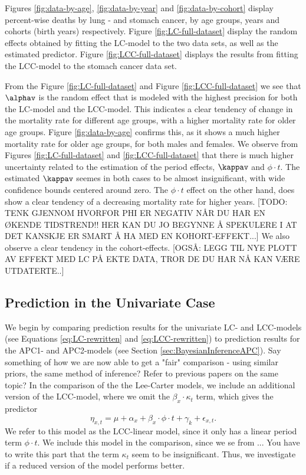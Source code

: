 \newpar Figures \ref{fig:data-by-age}, \ref{fig:data-by-year} and \ref{fig:data-by-cohort} display percent-wise deaths by lung - and stomach cancer, by age groups, years and cohorts (birth years) respectively. Figure \ref{fig:LC-full-dataset} display the random effects obtained by fitting the LC-model to the two data sets, as well as the estimated predictor. Figure \ref{fig:LCC-full-dataset} displays the results from fitting the LCC-model to the stomach cancer data set. 

\newpar From the Figure \ref{fig:LC-full-dataset} and Figure \ref{fig:LCC-full-dataset} we see that $\alphav$ is the random effect that is modeled with the highest precision for both the LC-model and the LCC-model. This indicates a clear tendency of change in the mortality rate for different age groups, with a higher mortality rate for older age groups. Figure \ref{fig:data-by-age} confirms this, as it shows a much higher mortality rate for older age groups, for both males and females. 
\newpar We observe from Figures \ref{fig:LC-full-dataset} and \ref{fig:LCC-full-dataset} that there is much higher uncertainty related to the estimation of the period effects, $\kappav$ and $\phi\cdot t$. The estimated $\kappav$ seemes in both cases to be almost insignificant, with wide confidence bounds centered around zero. The $\phi \cdot t$ effect on the other hand, does show a clear tendency of a decreasing mortality rate for higher years. [TODO: TENK GJENNOM HVORFOR PHI ER NEGATIV NÅR DU HAR EN ØKENDE TIDSTREND!! HER KAN DU JO BEGYNNE Å SPEKULERE I AT DET KANSKJE ER SMART Å HA MED EN KOHORT-EFFEKT...] We also observe a clear tendency in the cohort-effects. [OGSÅ: LEGG TIL NYE PLOTT AV EFFEKT MED LC PÅ EKTE DATA, TROR DE DU HAR NÅ KAN VÆRE UTDATERTE..]

\subsection{Prediction in the Univariate Case}
We begin by comparing prediction results for the univariate LC- and LCC-models (see Equations \ref{eq:LC-rewritten} and \ref{eq:LCC-rewritten}) to prediction results for the APC1- and APC2-models (see Section \ref{sec:BayesianInferenceAPC}).
\textcolor{myDarkGreen}{Say something of how we are now able to get a "fair" comparison - using similar priors, the same method of inference? Refer to previous papers on the same topic? }
In the comparison of the the Lee-Carter models, we include an additional version of the LCC-model, where we omit the $\beta_x\cdot \kappa_t$ term, which gives the predictor
\begin{equation}
    \eta_{x,t} = \mu + \alpha_x + \beta_x\cdot \phi \cdot t + \gamma_k + \epsilon_{x,t}.
\end{equation}
We refer to this model as the LCC-linear model, since it only has a linear period term $\phi \cdot t$. We include this model in the comparison, since we se from ... \textcolor{myDarkGreen}{You have to write this part} that the term $\kappa_t$ seem to be insignificant. Thus, we investigate if a reduced version of the model performs better. 

